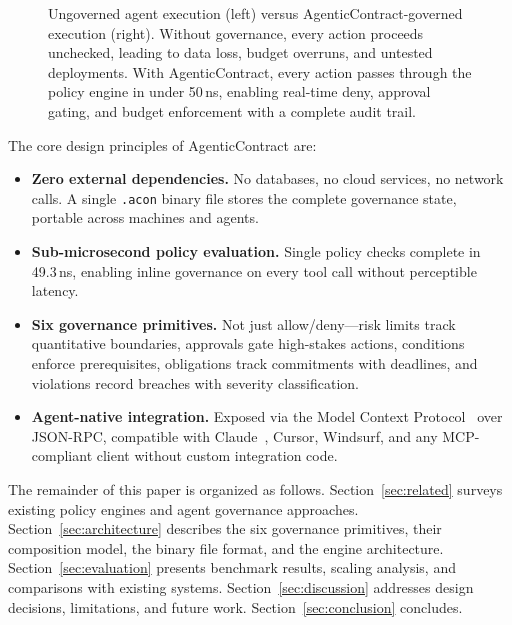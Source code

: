 \documentclass[10pt, twocolumn]{article}
\begin{document}
\begin{figure}[t]
\caption{Ungoverned agent execution (left) versus AgenticContract-governed execution (right). Without governance, every action proceeds unchecked, leading to data loss, budget overruns, and untested deployments. With AgenticContract, every action passes through the policy engine in under 50\,ns, enabling real-time deny, approval gating, and budget enforcement with a complete audit trail.}
\label{fig:motivation}
\end{figure}

The core design principles of AgenticContract are:

\begin{itemize}[nosep, leftmargin=*]
  \item \textbf{Zero external dependencies.} No databases, no cloud services, no network calls. A single \texttt{.acon} binary file stores the complete governance state, portable across machines and agents.
  \item \textbf{Sub-microsecond policy evaluation.} Single policy checks complete in 49.3\,ns, enabling inline governance on every tool call without perceptible latency.
  \item \textbf{Six governance primitives.} Not just allow/deny---risk limits track quantitative boundaries, approvals gate high-stakes actions, conditions enforce prerequisites, obligations track commitments with deadlines, and violations record breaches with severity classification.
  \item \textbf{Agent-native integration.} Exposed via the Model Context Protocol~\cite{mcp2024} over JSON-RPC, compatible with Claude~\cite{anthropic2024claude}, Cursor, Windsurf, and any MCP-compliant client without custom integration code.
\end{itemize}

The remainder of this paper is organized as follows. Section~\ref{sec:related} surveys existing policy engines and agent governance approaches. Section~\ref{sec:architecture} describes the six governance primitives, their composition model, the binary file format, and the engine architecture. Section~\ref{sec:evaluation} presents benchmark results, scaling analysis, and comparisons with existing systems. Section~\ref{sec:discussion} addresses design decisions, limitations, and future work. Section~\ref{sec:conclusion} concludes.

\end{document}
